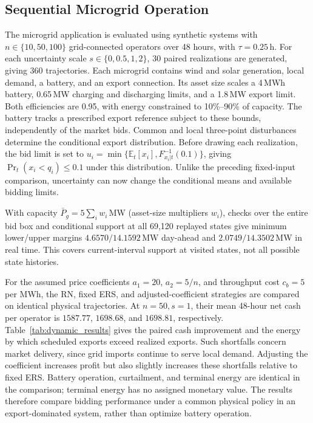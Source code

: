 \documentclass[journal]{IEEEtran}
\begin{document}
\subsection{Sequential Microgrid Operation}
\label{sec:dynamic_study}
The microgrid application is evaluated using synthetic systems with $n\in\{10,50,100\}$ grid-connected operators over 48 hours, with $\tau=0.25$\,h. For each uncertainty scale $s\in\{0,0.5,1,2\}$, 30 paired realizations are generated, giving 360 trajectories. Each microgrid contains wind and solar generation, local demand, a battery, and an export connection. Its asset size scales a 4\,MWh battery, 0.65\,MW charging and discharging limits, and a 1.8\,MW export limit. Both efficiencies are 0.95, with energy constrained to 10\%--90\% of capacity. The battery tracks a prescribed export reference subject to these bounds, independently of the market bids. Common and local three-point disturbances determine the conditional export distribution. Before drawing each realization, the bid limit is set to $u_i=\min\{\mathbb E_t[x_i],F^{-1}_{x_i|t}(0.1)\}$, giving $\Pr_t(x_i<q_i)\leq0.1$ under this distribution. Unlike the preceding fixed-input comparison, uncertainty can now change the conditional means and available bidding limits.

With capacity $\bar P_g=5\sum_iw_i$\,MW (asset-size multipliers $w_i$), checks over the entire bid box and conditional support at all 69,120 replayed states give minimum lower/upper margins $4.6570/14.1592$\,MW day-ahead and $2.0749/14.3502$\,MW in real time. This covers current-interval support at visited states, not all possible state histories.

For the assumed price coefficients $a_1=20$, $a_2=5/n$, and throughput cost $c_b=5$ per MWh, the RN, fixed ERS, and adjusted-coefficient strategies are compared on identical physical trajectories. At $n=50,s=1$, their mean 48-hour net cash per operator is $1587.77$, $1698.68$, and $1698.81$, respectively. Table~\ref{tab:dynamic_results} gives the paired cash improvement and the energy by which scheduled exports exceed realized exports. Such shortfalls concern market delivery, since grid imports continue to serve local demand. Adjusting the coefficient increases profit but also slightly increases these shortfalls relative to fixed ERS. Battery operation, curtailment, and terminal energy are identical in the comparison; terminal energy has no assigned monetary value. The results therefore compare bidding performance under a common physical policy in an export-dominated system, rather than optimize battery operation.
\end{document}
